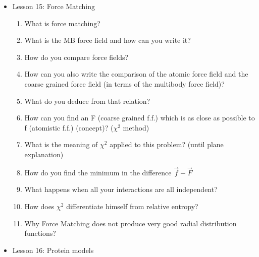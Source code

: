 {\begin{itemize}
\begin{enumerate}
        \item What is Inverse Monte Carlo?
        \item What do you have to compute by using inverse Monte Carlo? (susceptibility matrix)
        \item What does the susceptibility matrix tell you?
        \item How do you calculate the infinitesimal change in potential energy after
        \item How does Monte Carlo converge?
        \item obtain from relative entropy the susceptibility matrix
        \item What softer do you generally use to parametrize the CG  potential?
        \item Is the cut-off important in Boltzmann inversion?
        \item Is parametrization always correct or is it specific?
    \end{enumerate}
    \item Lesson 15: Force Matching
    \begin{enumerate}
        \item What is force matching?
        \item What is the MB force field and how can you write it?
        \item How do you compare force fields?
        \item How can you also write the comparison of the atomic force field and the coarse grained force field (in terms of the multibody force field)?
        \item What do you deduce from that relation?
        \item How can you find an F (coarse grained f.f.) which is as close as possible to f (atomistic f.f.) (concept)? ($\chi^2$ method) 
        \item What is the meaning of $\chi^2$ applied to this problem? (until plane explanation)
        \item How do you find the minimum in the difference $\vec{f} - \vec{F}$
        \item What happens when all your interactions are all independent?
        \item How does $\chi^2$ differentiate himself from relative entropy?
        \item Why Force Matching does not produce very good radial distribution functions?
    \end{enumerate}
    \item Lesson 16: Protein models

\end{itemize}}
